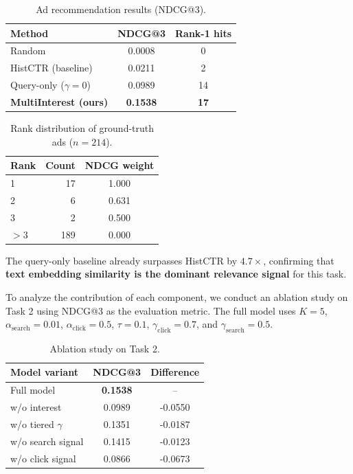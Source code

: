 \documentclass[sigconf, nonacm]{acmart}
\begin{document}
\begin{table}[h]
\centering
\caption{Ad recommendation results (NDCG@3).}
\label{tab:results}
\small
\begin{tabular}{lcc}
\toprule
Method & NDCG@3 & Rank-1 hits \\
\midrule
Random & 0.0008 & 0 \\
HistCTR (baseline) & 0.0211 & 2 \\
Query-only ($\gamma\!=\!0$) & 0.0989 & 14 \\
\textbf{MultiInterest (ours)} & \textbf{0.1538} & \textbf{17} \\
\bottomrule
\end{tabular}
\end{table}

\begin{table}[h]
\centering
\caption{Rank distribution of ground-truth ads ($n\!=\!214$).}
\label{tab:rankdist}
\small
\begin{tabular}{lrc}
\toprule
Rank & Count & NDCG weight \\
\midrule
1       & 17  & 1.000 \\
2       & 6   & 0.631 \\
3       & 2   & 0.500 \\
$> 3$ & 189 & 0.000 \\
\bottomrule
\end{tabular}
\end{table}

The query-only baseline already surpasses HistCTR by $4.7\times$,
confirming that \textbf{text embedding similarity is the dominant
relevance signal} for this task.


To analyze the contribution of each component, we conduct an ablation study on Task 2 using NDCG@3 as the evaluation metric. The full model uses $K=5$, $\alpha_{\text{search}}=0.01$, $\alpha_{\text{click}}=0.5$, $\tau=0.1$, $\gamma_{\text{click}}=0.7$, and $\gamma_{\text{search}}=0.5$.

\begin{table}[h]
\centering
\caption{Ablation study on Task 2.}
\label{tab:ablation}
\begin{tabular}{lcc}
\hline
Model variant & NDCG@3 & Difference \\
\hline
Full model & \textbf{0.1538} & -- \\
w/o interest & 0.0989 & -0.0550 \\
w/o tiered $\gamma$ & 0.1351 & -0.0187 \\
w/o search signal & 0.1415 & -0.0123 \\
w/o click signal & 0.0866 & -0.0673 \\
\hline
\end{tabular}
\end{table}
\end{document}
